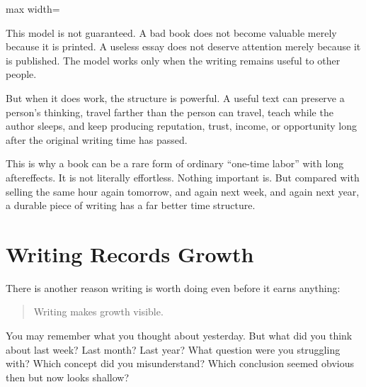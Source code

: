 \begin{center}
\begin{adjustbox}{max width=\linewidth}
\end{adjustbox}
\end{center}

This model is not guaranteed. A bad book does not become valuable merely because it is printed. A useless essay does not deserve attention merely because it is published. The model works only when the writing remains useful to other people.

But when it does work, the structure is powerful. A useful text can preserve a person's thinking, travel farther than the person can travel, teach while the author sleeps, and keep producing reputation, trust, income, or opportunity long after the original writing time has passed.

This is why a book can be a rare form of ordinary ``one-time labor'' with long aftereffects. It is not literally effortless. Nothing important is. But compared with selling the same hour again tomorrow, and again next week, and again next year, a durable piece of writing has a far better time structure.

\section*{Writing Records Growth}

There is another reason writing is worth doing even before it earns anything:

\begin{quote}
Writing makes growth visible.
\end{quote}

You may remember what you thought about yesterday. But what did you think about last week? Last month? Last year? What question were you struggling with? Which concept did you misunderstand? Which conclusion seemed obvious then but now looks shallow?


